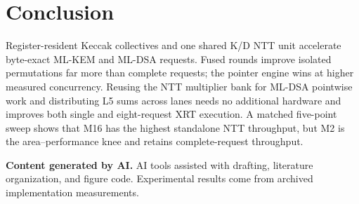 \documentclass[conference,letterpaper]{IEEEtran}
\begin{document}
\section{Conclusion}
Register-resident Keccak collectives and one shared K/D NTT unit accelerate
byte-exact ML-KEM and ML-DSA requests. Fused rounds improve isolated
permutations far more than complete requests; the pointer engine wins at
higher measured concurrency. Reusing the NTT multiplier bank for ML-DSA
pointwise work and distributing L5 sums across lanes needs no additional
hardware and improves both single and eight-request XRT execution. A matched
five-point sweep shows that M16 has the highest standalone NTT throughput,
but M2 is the area--performance knee and retains complete-request throughput.

\noindent\textbf{Content generated by AI.} AI tools assisted with drafting,
literature organization, and figure code. Experimental results come from
archived implementation measurements.

\clearpage
\nobalance
{}
\begingroup


\endgroup
\end{document}
